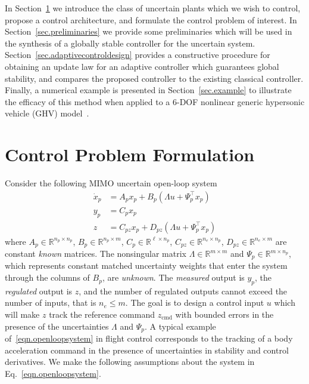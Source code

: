 \documentclass[]{../sty/JGCD}
\theoremstyle{examplestyle}
\begin{document}
  In Section~\ref{sec.controlproblem} we introduce the class of uncertain plants which we wish to control, propose a control architecture, and formulate the control problem of interest.
  In Section~\ref{sec.preliminaries} we provide some preliminaries which will be used in the synthesis of a globally stable controller for the uncertain system.
  Section~\ref{sec.adaptivecontroldesign} provides a constructive procedure for obtaining an update law for an adaptive controller which guarantees global stability, and compares the proposed controller to the existing classical controller.
  Finally, a numerical example is presented in Section~\ref{sec.example} to illustrate the efficacy of this method when applied to a 6-DOF nonlinear generic hypersonic vehicle (GHV) model\ \cite{wiese.adaptive.2013,rollins.nonlinear.2013}.

  \section{Control Problem Formulation}\label{sec.controlproblem}

  Consider the following MIMO uncertain open-loop system
  \begin{equation}
    \label{eqn.openloopsystem}
    \begin{split}
      \dot{x}_{p}&=A_{p}x_{p}+B_{p}(\Lambda u+\Psi_{p}^{\top}x_{p}) \\
      y_{p}&=C_{p}x_{p} \\
      z&=C_{pz}x_{p}+D_{pz}(\Lambda u+\Psi_{p}^{\top}x_{p})
    \end{split}
  \end{equation}
  where $A_{p}\in\mathbb{R}^{n_{p}\times n_{p}}$, $B_{p}\in\mathbb{R}^{n_{p}\times m}$, $C_{p}\in\mathbb{R}^{\ell\times n_{p}}$, $C_{pz}\in\mathbb{R}^{n_{e}\times n_{p}}$, $D_{pz}\in\mathbb{R}^{n_{e}\times m}$ are constant \textit{known} matrices.
  The nonsingular matrix $\Lambda\in\mathbb{R}^{m\times m}$ and $\Psi_{p}\in\mathbb{R}^{m\times n_{p}}$, which represents constant matched uncertainty weights that enter the system through the columns of $B_{p}$, are \textit{unknown}.
  The \textit{measured} output is $y_{p}$, the \textit{regulated} output is $z$, and the number of regulated outputs cannot exceed the number of inputs, that is $n_{e}\leq m$.
  The goal is to design a control input $u$ which will make $z$ track the reference command $z_{\text{cmd}}$ with bounded errors in the presence of the uncertainties $\Lambda$ and $\Psi_{p}$.
  A typical example of\ \eqref{eqn.openloopsystem} in flight control corresponds to the tracking of a body acceleration command in the presence of uncertainties in stability and control derivatives.
  We make the following assumptions about the system in Eq.\ \eqref{eqn.openloopsystem}.
\end{document}
